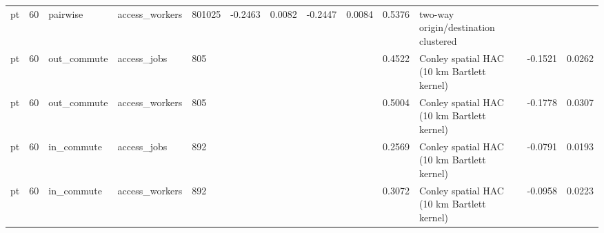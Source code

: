 \begin{table}[htbp]
\begin{tabular}{lllllllllllll}
pt & 60 & pairwise & access\_workers & 801025 & -0.2463 & 0.0082 & -0.2447 & 0.0084 & 0.5376 & two-way origin/destination clustered &  &  \\
pt & 60 & out\_commute & access\_jobs & 805 &  &  &  &  & 0.4522 & Conley spatial HAC (10 km Bartlett kernel) & -0.1521 & 0.0262 \\
pt & 60 & out\_commute & access\_workers & 805 &  &  &  &  & 0.5004 & Conley spatial HAC (10 km Bartlett kernel) & -0.1778 & 0.0307 \\
pt & 60 & in\_commute & access\_jobs & 892 &  &  &  &  & 0.2569 & Conley spatial HAC (10 km Bartlett kernel) & -0.0791 & 0.0193 \\
pt & 60 & in\_commute & access\_workers & 892 &  &  &  &  & 0.3072 & Conley spatial HAC (10 km Bartlett kernel) & -0.0958 & 0.0223 \\
\bottomrule
\end{tabular}
\end{table}
